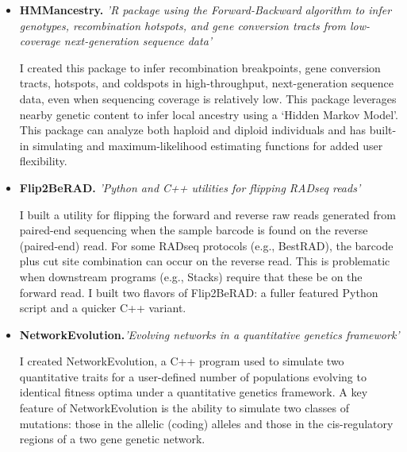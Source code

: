 \documentclass[11pt,letterpaper,sans]{moderncv}        %
\begin{document}
\begin{itemize}

\item{\textbf{HMMancestry.} \textit{'R package using the Forward-Backward algorithm to infer genotypes, recombination hotspots, and gene conversion tracts from low-coverage next-generation sequence data'}

\vspace{4pt}

\small{I created this package to infer recombination breakpoints, gene conversion tracts, hotspots, and coldspots in high-throughput, next-generation sequence data, even when sequencing coverage is relatively low. This package leverages nearby genetic content to infer local ancestry using a `Hidden Markov Model'. This package can analyze both haploid and diploid individuals and has built-in simulating and maximum-likelihood estimating functions for added user flexibility.}}


\item{\textbf{Flip2BeRAD.} \textit{'Python and C++ utilities for flipping RADseq reads'}

\vspace{4pt}

\small{I built a utility for flipping the forward and reverse raw reads generated from paired-end sequencing when the sample barcode is found on the reverse (paired-end) read. For some RADseq protocols (e.g., BestRAD), the barcode plus cut site combination can occur on the reverse read. This is problematic when downstream programs (e.g., Stacks) require that these be on the forward read. I built two flavors of Flip2BeRAD: a fuller featured Python script and a quicker C++ variant.}}

\vspace{4pt}

\item{\textbf{NetworkEvolution.}\textit{'Evolving networks in a quantitative genetics framework'}

\vspace{4pt}

\small{I created NetworkEvolution, a C++ program used to simulate two quantitative traits for a user-defined number of populations evolving to identical fitness optima under a quantitative genetics framework. A key feature of NetworkEvolution is the ability to simulate two classes of mutations: those in the allelic (coding) alleles and those in the cis-regulatory regions of a two gene genetic network.}}

\end{itemize}
\end{document}
